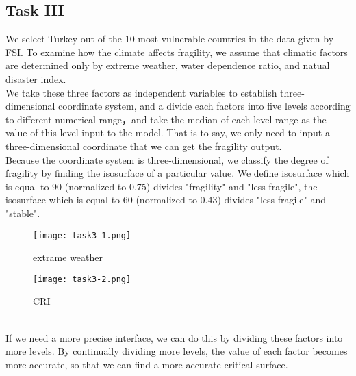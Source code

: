 \documentclass{mcmthesis}
\begin{document}
\subsection{Task III}
We select Turkey out of the 10 most vulnerable countries in the data given by FSI. To examine how the climate affects fragility, we assume that climatic factors are determined only by extreme weather, water dependence ratio, and natual disaster index.\\
We take these three factors as independent variables to establish three-dimensional coordinate system, and a divide each factors into five levels according to different numerical range，and take the median of each level range as the value of this level input to the model. That is to say, we only need to input a three-dimensional coordinate that we can get the fragility output.\\
Because the coordinate system is three-dimensional, we classify the degree of fragility by finding the isosurface of a particular value. We define isosurface which is equal to 90 (normalized to 0.75) divides  "fragility" and "less fragile", the isosurface which is equal to 60 (normalized to 0.43) divides "less fragile" and "stable".
\begin{figure}[h]
  \begin{minipage}[h]{0.48\textwidth}
  \flushleft
  \texttt{[image: task3-1.png]}
  \caption{extrame weather}
  \end{minipage}
  \begin{minipage}[h]{0.48\textwidth}
  \flushright
  \texttt{[image: task3-2.png]}
  \caption{CRI}
  \end{minipage}
\end{figure} \\
If we need a more precise interface, we can do this by dividing these factors into more levels. By continually dividing more levels, the value of each factor becomes more accurate, so that we can find a more accurate critical surface.
\newpage
\end{document}
